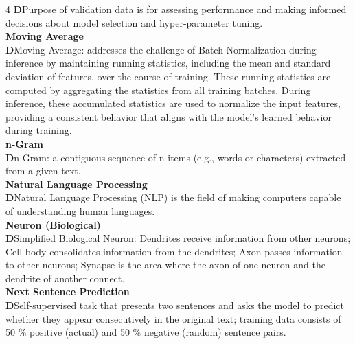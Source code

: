 \documentclass[8pt]{extarticle}
\newcommand{\dtag}{\textcolor{definitioncolor}{\tiny\textbf{D}}\;}
\begin{document}
\begin{multicols}{4}
\dtag Purpose of validation data is for assessing performance and making informed decisions about model selection and hyper-parameter tuning.\\
\vspace{2pt}\textbf{Moving Average}\\
\dtag Moving Average: addresses the challenge of Batch Normalization during inference by maintaining running statistics, including the mean and standard deviation of features, over the course of training. These running statistics are computed by aggregating the statistics from all training batches. During inference, these accumulated statistics are used to normalize the input features, providing a consistent behavior that aligns with the model's learned behavior during training.\\
\vspace{2pt}\textbf{n-Gram}\\
\dtag n-Gram: a contiguous sequence of n items (e.g., words or characters) extracted from a given text.\\
\vspace{2pt}\textbf{Natural Language Processing}\\
\dtag Natural Language Processing (NLP) is the field of making computers capable of understanding human languages.\\
\vspace{2pt}\textbf{Neuron (Biological)}\\
\dtag Simplified Biological Neuron: Dendrites receive information from other neurons; Cell body consolidates information from the dendrites; Axon passes information to other neurons; Synapse is the area where the axon of one neuron and the dendrite of another connect.\\
\vspace{2pt}\textbf{Next Sentence Prediction}\\
\dtag Self-supervised task that presents two sentences and asks the model to predict whether they appear consecutively in the original text; training data consists of 50 \% positive (actual) and 50 \% negative (random) sentence pairs.\\


\end{multicols}
\end{document}
